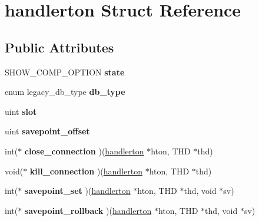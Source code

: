 \hypertarget{structhandlerton}{}\section{handlerton Struct Reference}
\label{structhandlerton}
\subsection*{Public Attributes}
\begin{DoxyCompactItemize}
\item 
\mbox{\label{structhandlerton_ac611b993207fb0a7c383b7f183005205}} 
S\+H\+O\+W\+\_\+\+C\+O\+M\+P\+\_\+\+O\+P\+T\+I\+ON {\bfseries state}
\item 
\mbox{\label{structhandlerton_a6031b196b90687ecfe92de38dc553d3b}} 
enum legacy\+\_\+db\+\_\+type {\bfseries db\+\_\+type}
\item 
\mbox{\label{structhandlerton_a715538b1a749546dfeedb2cd41b28e30}} 
uint {\bfseries slot}
\item 
\mbox{\label{structhandlerton_a55518ff2a6fdf1ad4c03e3aa9d6eae10}} 
uint {\bfseries savepoint\+\_\+offset}
\item 
\mbox{\label{structhandlerton_a37076439ded72f45adb4c952cca1995f}} 
int($\ast$ {\bfseries close\+\_\+connection} )(\mbox{\hyperlink{structhandlerton}{handlerton}} $\ast$hton, T\+HD $\ast$thd)
\item 
\mbox{\label{structhandlerton_a6d0cdabc3302d06ca48d18aea124b24c}} 
void($\ast$ {\bfseries kill\+\_\+connection} )(\mbox{\hyperlink{structhandlerton}{handlerton}} $\ast$hton, T\+HD $\ast$thd)
\item 
\mbox{\label{structhandlerton_a134e85cecbc8d7dea66712c5b03e742a}} 
int($\ast$ {\bfseries savepoint\+\_\+set} )(\mbox{\hyperlink{structhandlerton}{handlerton}} $\ast$hton, T\+HD $\ast$thd, void $\ast$sv)
\item 
\mbox{\label{structhandlerton_aeaf0813d3463600e6f1e05b23e552eb3}} 
int($\ast$ {\bfseries savepoint\+\_\+rollback} )(\mbox{\hyperlink{structhandlerton}{handlerton}} $\ast$hton, T\+HD $\ast$thd, void $\ast$sv)

\end{DoxyCompactItemize}

